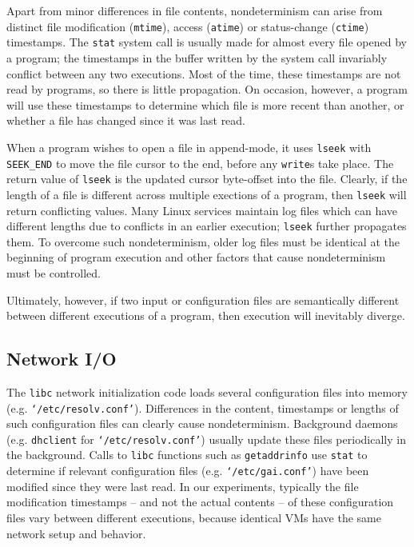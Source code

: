  \newline
Apart from minor differences in file contents,
nondeterminism can arise from distinct file 
modification (\texttt{mtime}), access (\texttt{atime}) or status-change (\texttt{ctime})
timestamps.
The \texttt{stat} system call is usually made for almost
every file opened by a program; the timestamps
in the buffer written by the system call invariably
conflict between any two executions. Most of the time,
these timestamps are not read by programs,
so there is little propagation. On occasion, 
however, a program will use these timestamps
to determine which file is more recent than another,
or whether a file has changed since
it was last read. \newline

 \newline
When a program wishes to open
a file in append-mode, it uses \texttt{lseek}
with \texttt{SEEK\_END} to move
the file cursor to the end,
before any \texttt{write}s take place.
The return value of \texttt{lseek} is the
updated cursor byte-offset into the file.
Clearly, if the length of a file is different across
multiple exections of a program, then
\texttt{lseek} will return conflicting values.
Many Linux services maintain log files
which can have different lengths due
to conflicts in an earlier execution; \texttt{lseek}
further propagates them. To overcome
such nondeterminism, older log files
must be identical at the beginning 
of program execution and other
factors that cause nondeterminism
must be controlled. 

\newpage
Ultimately, however, if two input or configuration files
are semantically different between
different executions of a program, then 
execution will inevitably diverge. 

\subsection{Network I/O} \label{ch3:netio}
 \newline
The \texttt{libc} network initialization
code loads several configuration files
into memory (e.g. \texttt{`/etc/resolv.conf'}). 
Differences in the content, timestamps or lengths
of such configuration files can clearly cause nondeterminism.
Background daemons (e.g. \texttt{dhclient} for \texttt{`/etc/resolv.conf'}) 
usually update these files periodically in the background.
Calls to \texttt{libc} functions such as \texttt{getaddrinfo} use \texttt{stat} 
to determine if relevant configuration files (e.g. \texttt{`/etc/gai.conf'})
have been modified since they were last read. 
In our experiments, typically the file modification timestamps 
-- and not the actual contents -- of these configuration files 
vary between different executions,
because identical VMs have the same network setup
and behavior. \newline

